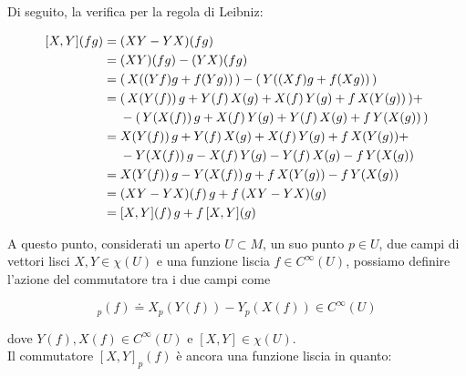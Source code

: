 Di seguito, la verifica per la regola di Leibniz:

\begin{align}
	\begin{split}
		[X,Y](fg) &= (XY-YX)(fg) \\
		&= (XY)(fg) - (YX)(fg) \\
		&= ( \, X((Yf) g + f (Y g)) \, ) - ( \, Y((Xf) g + f (X g)) \, ) \\
		&= ( \, X(Y(f)) \, g + Y(f) \, X(g) + X(f) \, Y(g) + f \, X(Y(g)) \, ) + \\
		& \hal - ( \, Y(X(f)) \, g + X(f) \, Y(g) + Y(f) \, X(g) + f \, Y(X(g)) \, ) \\
		&= X(Y(f)) \, g + Y(f) \, X(g) + X(f) \, Y(g) + f \, X(Y(g)) + \\
		& \hal - Y(X(f)) \, g - X(f) \, Y(g) - Y(f) \, X(g) - f \, Y(X(g)) \\
		&= X(Y(f)) \, g - Y(X(f)) \, g + f \, X(Y(g)) - f \, Y(X(g)) \\
		&= (XY-YX)(f) \, g + f \, (XY-YX)(g) \\
		&= [X,Y](f) \, g + f \, [X,Y](g)
	\end{split}
\end{align}

A questo punto, considerati un aperto $ U \subset M $, un suo punto $ p \in U $, due campi di vettori lisci $ X,Y \in \chi(U) $ e una funzione liscia $ f \in C^{\infty}(U) $, possiamo definire l'azione del commutatore tra i due campi come

\begin{equation}
	[X,Y]_{p}(f) \doteq X_{p} (Y(f)) - Y_{p} (X(f)) \in C^{\infty}(U)
\end{equation}

dove $ Y(f), X(f) \in C^{\infty}(U) $ e $ [X,Y] \in \chi(U) $. \\
Il commutatore $ [X,Y]_{p}(f) $ è ancora una funzione liscia in quanto:


